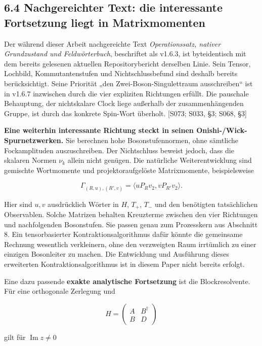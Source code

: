 \subsection{6.4 Nachgereichter Text: die interessante Fortsetzung liegt
in
Matrixmomenten}\label{nachgereichter-text-die-interessante-fortsetzung-liegt-in-matrixmomenten}

Der während dieser Arbeit nachgereichte Text \emph{Operationssatz,
nativer Grundzustand und Feldwörterbuch}, beschriftet als v1.6.3, ist
byteidentisch mit dem bereits gelesenen aktuellen Repositorybericht
derselben Linie. Sein Tensor, Lochbild, Kommutantenstufen und
Nichtschlussbefund sind deshalb bereits berücksichtigt. Seine Priorität
„den Zwei-Boson-Singulettraum ausschreiben`` ist in v1.6.7 inzwischen
durch die vier expliziten Richtungen erfüllt. Die pauschale Behauptung,
der nichtskalare Clock liege außerhalb der zusammenhängenden Gruppe, ist
durch das konkrete Spin-Wort überholt. {[}S073; S033, §3; S068, §3{]}

\textbf{Eine weiterhin interessante Richtung steckt in seinen
Onishi-/Wick-Spurnetzwerken.} Sie berechnen hohe Bosonstufennormen, ohne
sämtliche Fockamplituden auszuschreiben. Der Nichtschluss beweist
jedoch, dass die skalaren Normen \(\nu_k\) allein nicht genügen. Die
natürliche Weiterentwicklung sind gemischte Wortmomente und
projektoraufgelöste Matrixmomente, beispielsweise

\[\Gamma_{(R,u),(R',v)}
=\langle uP_Rv_2,vP_{R'}v_2\rangle.\]

Hier sind \(u,v\) ausdrücklich Wörter in \(H\), \(T_+\), \(T_-\) und den
benötigten tatsächlichen Observablen. Solche Matrizen behalten
Kreuzterme zwischen den vier Richtungen und nachfolgenden Bosonstufen.
Sie passen genau zum Prozesskern aus Abschnitt 8. Ein tensorbasierter
Kontraktionsalgorithmus dafür könnte die gemeinsame Rechnung wesentlich
verkleinern, ohne den verzweigten Raum irrtümlich zu einer einzigen
Bosonleiter zu machen. Die Entwicklung und Ausführung dieses erweiterten
Kontraktionsalgorithmus ist in diesem Paper nicht bereits erfolgt.

Eine dazu passende \textbf{exakte analytische Fortsetzung} ist die
Blockresolvente. Für eine orthogonale Zerlegung und

\[H=\begin{pmatrix}A&B^\dagger\\B&D\end{pmatrix}\]

gilt für \(\operatorname{Im}z\ne0\)

